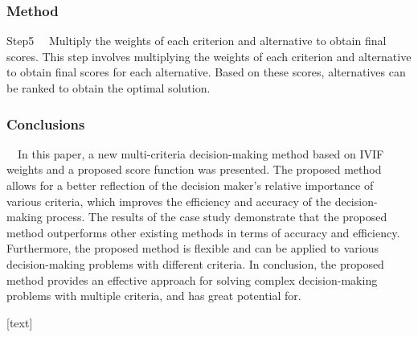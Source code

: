 \documentclass{beamer}
\begin{document}
\begin{frame}[fragile]
	\frametitle{Method}
        \begin{block}{Step5}
        \ \ Multiply the weights of each criterion and alternative to obtain final scores. This step involves multiplying the weights of each criterion and alternative to obtain final scores for each alternative. Based on these scores, alternatives can be ranked to obtain the optimal solution.
        \end{block}
        
\end{frame}
\begin{frame}[fragile]
	\frametitle{Conclusions}
        \ \ In this paper, a new multi-criteria decision-making method based on IVIF weights and a proposed score function was presented. The proposed method allows for a better reflection of the decision maker's relative importance of various criteria, which improves the efficiency and accuracy of the decision-making process. The results of the case study demonstrate that the proposed method outperforms other existing methods in terms of accuracy and efficiency. Furthermore, the proposed method is flexible and can be applied to various decision-making problems with different criteria. In conclusion, the proposed method provides an effective approach for solving complex decision-making problems with multiple criteria, and has great potential for.
        
\end{frame}

[text]
\end{document}
